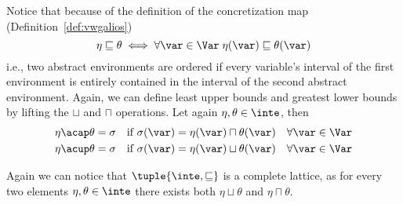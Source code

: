 Notice that because of the definition of the concretization map
(Definition~\ref{def:vwgalios})
\begin{equation*}
  \eta \sqsubseteq \theta \iff \forall \var \in \Var \; \eta(\var) \sqsubseteq \theta(\var)
\end{equation*}
i.e., two abstract environments are ordered if every variable's
interval of the first environment is entirely contained in the
interval of the second abstract environment.   Again, we can define least upper bounds and greatest lower
bounds by lifting the \(\sqcup\) and \(\sqcap\) operations. Let again
\(\eta, \theta \in \inte\), then
\begin{align*}
  \eta \acap \theta = \sigma & \quad \text{if } \sigma(\var) = \eta(\var) \sqcap \theta(\var) \quad \forall \var\in\Var \\
  \eta \acup \theta = \sigma & \quad \text{if } \sigma(\var) = \eta(\var) \sqcup \theta(\var) \quad \forall \var\in\Var \\
\end{align*}

Again we can notice that \(\tuple{\inte, \sqsubseteq}\) is a complete
lattice, as for every two elements \(\eta,\theta\in\inte\) there
exists both \(\eta \sqcup \theta\) and \(\eta \sqcap \theta\).
